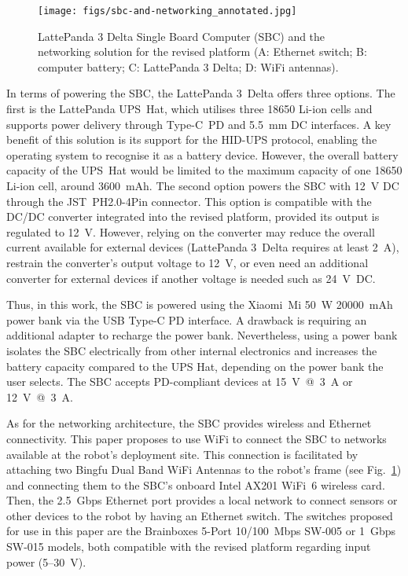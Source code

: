 \documentclass[letterpaper,10pt,conference]{IEEEtran} %
\def\figref#1{Fig.~\ref{#1}}
\begin{document}
\begin{figure}[t]
\centering
\texttt{[image: figs/sbc-and-networking\_annotated.jpg]}
\caption{LattePanda 3 Delta Single Board Computer (SBC) and the
networking solution for the revised platform
(A: Ethernet switch; B: computer battery;
C: LattePanda 3 Delta; D: WiFi antennas).}
\label{fig:sbc-networking}
\end{figure}

In terms of powering the SBC, the LattePanda 3~Delta offers three options.
The first is the LattePanda UPS~Hat, 
which utilises three 18650 Li-ion cells
and supports power delivery through Type-C~PD and 5.5~mm DC interfaces.
A key benefit of this solution is its support for the HID-UPS protocol,
enabling the operating system to recognise it as a battery device.
However, the overall battery capacity of the UPS~Hat would be
limited to the maximum capacity of one 18650 Li-ion cell, around 3600~mAh.
The second option powers the SBC with 12~V DC 
through the JST~PH2.0-4Pin connector.
This option is compatible with the DC/DC converter
integrated into the revised platform,
provided its output is regulated to 12~V.
However, relying on the converter may reduce the
overall current available for external devices
(LattePanda 3~Delta requires at least 2~A),
restrain the converter's output voltage to 12~V,
or even need an additional converter for external devices
if another voltage is needed such as 24~V~DC.

Thus, in this work, the SBC is powered
using the Xiaomi~Mi 50~W 20000~mAh power bank
via the USB Type-C PD interface.
A drawback is requiring an additional adapter to recharge the power bank.
Nevertheless, using a power bank
isolates the SBC electrically from other internal electronics and
increases the battery capacity compared to the UPS Hat,
depending on the power bank the user selects.
The SBC accepts PD-compliant devices at 15~V~@~3~A or 12~V~@~3~A.

As for the networking architecture,
the SBC provides wireless and Ethernet connectivity.
This paper proposes to use WiFi to
connect the SBC to networks available at the robot's deployment site.
This connection is facilitated by attaching
two Bingfu Dual Band WiFi Antennas to the robot's frame
(see \figref{fig:sbc-networking}) and connecting them to the
SBC's onboard Intel AX201 WiFi~6 wireless card.
Then, the 2.5~Gbps Ethernet port provides a
local network to connect sensors or other devices
to the robot by having an Ethernet switch.
The switches proposed for use in this paper are the
Brainboxes 5-Port 10/100~Mbps SW-005 or
1~Gbps SW-015 models,
both compatible with the revised platform regarding input power (5--30~V).
\end{document}
